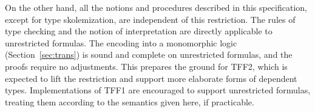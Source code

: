 On the other hand, all the notions and procedures described in this
specification, except for type skolemization, are independent of this
restriction. The rules of type checking and the notion of interpretation are
directly applicable to unrestricted formulas. The encoding into a monomorphic
logic (Section~\ref{sec:trans}) is sound and complete on unrestricted formulas,
and the proofs require
no adjustments. This prepares the ground for TFF2, which is expected to lift the
restriction and support more elaborate forms of dependent types. Implementations
of TFF1 are encouraged to support unrestricted formulas, treating them according
to the semantics given here, if practicable.


